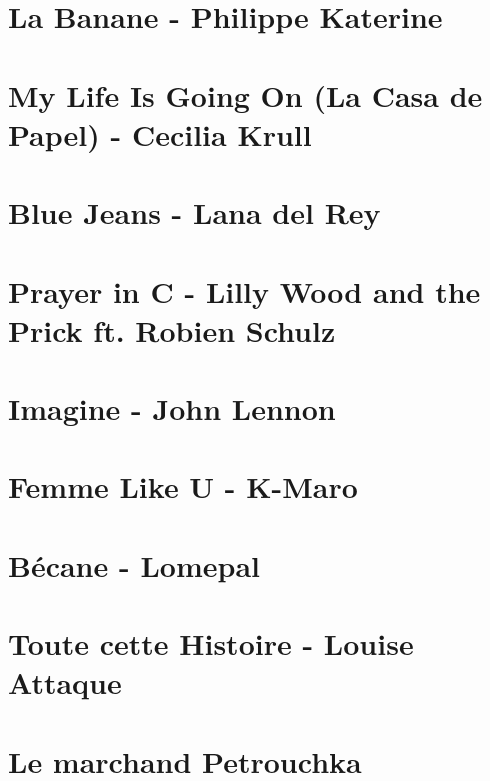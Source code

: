 \documentclass[11pt]{article}
\begin{document}
\section{La Banane - Philippe Katerine}


\section{My Life Is Going On (La Casa de Papel) - Cecilia Krull }
\begin{guitar}

\end{guitar}

\section{Blue Jeans - Lana del Rey}


\section{Prayer in C - Lilly Wood and the Prick ft. Robien Schulz}



\section{Imagine - John Lennon}


\section{Femme Like U - K-Maro}


\section{Bécane - Lomepal}


\section{Toute cette Histoire - Louise Attaque}


\section{Le marchand Petrouchka}
\begin{guitar}

\end{guitar}
\end{document}

